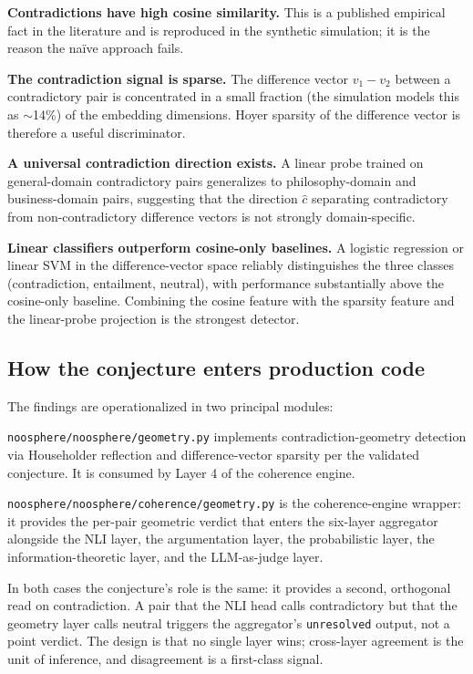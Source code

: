 \documentclass[11pt,letterpaper]{article}
\newcommand{\file}[1]{\texttt{#1}}
\begin{document}
\textbf{Contradictions have high cosine similarity.} This is a published empirical fact in the literature and is reproduced in the synthetic simulation; it is the reason the na\"ive approach fails.

\textbf{The contradiction signal is sparse.} The difference vector $v_1 - v_2$ between a contradictory pair is concentrated in a small fraction (the simulation models this as $\sim$14\%) of the embedding dimensions. Hoyer sparsity of the difference vector is therefore a useful discriminator.

\textbf{A universal contradiction direction exists.} A linear probe trained on general-domain contradictory pairs generalizes to philosophy-domain and business-domain pairs, suggesting that the direction $\hat{c}$ separating contradictory from non-contradictory difference vectors is not strongly domain-specific.

\textbf{Linear classifiers outperform cosine-only baselines.} A logistic regression or linear SVM in the difference-vector space reliably distinguishes the three classes (contradiction, entailment, neutral), with performance substantially above the cosine-only baseline. Combining the cosine feature with the sparsity feature and the linear-probe projection is the strongest detector.

\subsection{How the conjecture enters production code}

The findings are operationalized in two principal modules:

\file{noosphere/noosphere/geometry.py} implements contradiction-geometry detection via Householder reflection and difference-vector sparsity per the validated conjecture. It is consumed by Layer 4 of the coherence engine.

\file{noosphere/noosphere/coherence/geometry.py} is the coherence-engine wrapper: it provides the per-pair geometric verdict that enters the six-layer aggregator alongside the NLI layer, the argumentation layer, the probabilistic layer, the information-theoretic layer, and the LLM-as-judge layer.

In both cases the conjecture's role is the same: it provides a second, orthogonal read on contradiction. A pair that the NLI head calls contradictory but that the geometry layer calls neutral triggers the aggregator's \texttt{unresolved} output, not a point verdict. The design is that no single layer wins; cross-layer agreement is the unit of inference, and disagreement is a first-class signal.
\end{document}
